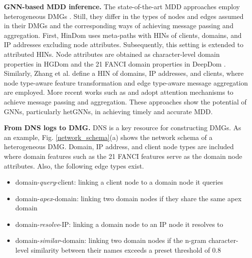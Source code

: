 \documentclass[conference,compsoc]{IEEEtran}
\begin{document}
\par \textbf{GNN-based MDD inference.} The state-of-the-art MDD approaches employ heterogeneous DMGs \cite{sun2019hindom,li2021dydom,li2022heterogeneous,sun2020deepdom,zhang2021attributed}. Still, they differ in the types of nodes and edges assumed in their DMGs and the corresponding ways of achieving message passing and aggregation. First, HinDom \cite{sun2019hindom} uses meta-paths with HINs of clients, domains, and IP addresses excluding node attributes. Subsequently, this setting is extended to attributed HINs. Node attributes are obtained as character-level domain properties in HGDom \cite{sun2020hgdom} and the 21 FANCI domain properties \cite{schuppen2018fanci} in DeepDom \cite{sun2020deepdom}. Similarly, Zhang et al. \cite{zhang2021attributed} define a HIN of domains, IP addresses, and clients, where node type-aware feature transformation and edge type-aware message aggregation are employed. More recent works such as \cite{li2022heterogeneous} and \cite{wang2022handom} adopt attention mechanisms to achieve message passing and aggregation. These approaches show the potential of GNNs, particularly hetGNNs, in achieving timely and accurate MDD.

\par \textbf{From DNS logs to DMG.} DNS is a key resource for constructing DMGs. As an example, Fig. \ref{network_schema}(a) shows the network schema of a heterogeneous DMG. Domain, IP address, and client node types are included where domain features such as the 21 FANCI features \cite{schuppen2018fanci} serve as the domain node attributes. Also, the following edge types exist. 
\begin{itemize}[leftmargin=*]
 \item domain-\textit{query}-client: linking a client node to a domain node it queries
 \item domain-\textit{apex}-domain: linking two domain nodes if they share the same apex domain
 \item domain-\textit{resolve}-IP: linking a domain node to an IP node it resolves to
 \item domain-\textit{similar}-domain: linking two domain nodes if the n-gram character-level similarity between their names exceeds a preset threshold of 0.8 
 \cite{kumarasinghe2022pdns} 
\end{itemize}
\end{document}
